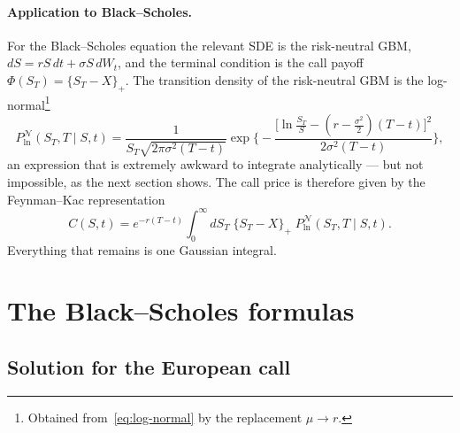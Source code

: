 \paragraph*{Application to Black--Scholes.}

For the Black--Scholes equation the relevant SDE is the risk-neutral GBM, $dS = rS\,dt + \sigma S\, dW_t$, and the terminal condition is the call payoff $\Phi(S_T) = \{S_T - X\}_+$.
The transition density of the risk-neutral GBM is the log-normal\footnote{Obtained from~\eqref{eq:log-normal} by the replacement $\mu\to r$.}
\begin{equation}
P^{\mathcal{N}}_{\ln}(S_T, T \mid S, t) = \frac{1}{S_T\sqrt{2\pi\sigma^2(T-t)}} \exp\!\biggl\{-\frac{\bigl[\ln\frac{S_T}{S} - (r-\frac{\sigma^2}{2})(T-t)\bigr]^2}{2\sigma^2(T-t)}\biggr\},
\end{equation}
an expression that is extremely awkward to integrate analytically --- but not impossible, as the next section shows.
The call price is therefore given by the Feynman--Kac representation\cite{Kac1949}
\begin{equation}\label{eq:feynman-kac-bs}
C(S,t) = e^{-r(T-t)}\int_0^{\infty}\!dS_T\;\{S_T - X\}_+\; P^{\mathcal{N}}_{\ln}(S_T, T \mid S, t).
\end{equation}
Everything that remains is one Gaussian integral.


\section{The Black--Scholes formulas}\label{sec:bs-formulas}

\subsection{Solution for the European call}

